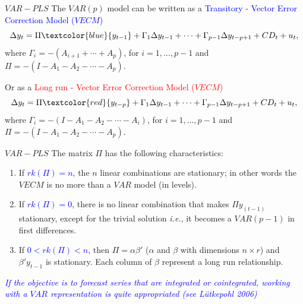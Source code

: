 \documentclass{beamer}
\newcommand{\?}{?`}
\begin{document}
\begin{frame}{$VAR-PLS$}
  The $VAR(p)$ model can be written as a  \textcolor{blue}{Transitory - Vector Error Correction Model ($VECM$)}
  \begin{displaymath}
    \Delta y_{t}=\Pi  \textcolor{blue}{ y_{t-1}}+\Gamma_1 \Delta y_{t-1} + \cdots +
    \Gamma_{p-1} \Delta y_{t-p+1} + CD_t + u_t,
  \end{displaymath}
  where $\Gamma_i=-(A_{i+1}+\cdots + A_p)$, for $i=1,\ldots ,p-1$ and
  $\Pi=-(I-A_1-A_2-\cdots - A_p)$.

\bigskip

  Or as a  \textcolor{red}{Long run - Vector Error Correction Model ($VECM$)}
  \begin{displaymath}
    \Delta y_t=\Pi \textcolor{red}{ y_{t-p}}+\Gamma_1 \Delta y_{t-1} + \cdots +
    \Gamma_{p-1} \Delta y_{t-p+1} + CD_t + u_t,
  \end{displaymath}
  where $\Gamma_i=-(I-A_{1}-A_2-\cdots -A_i)$, for $i=1,\ldots ,p-1$
  and $\Pi=-(I-A_1-A_2-\cdots - A_p)$.
\end{frame}


\begin{frame}{$VAR-PLS$}
  The matrix $\Pi$ has the following characteristics:
  \begin{enumerate}
  \item  If \textcolor{blue}{$rk(\Pi)=n$},  the $n$ linear combinations are stationary;
  in other words the $VECM$ is no more than a $VAR$ model (in levels).
  \item  If \textcolor{blue}{$rk(\Pi)=0$}, there is no linear combination that makes $\Pi y_{(t-1)}$ stationary,
  except for the trivial solution  {\it{i.e.}}, it becomes a $VAR(p-1)$ in first differences.
    \item  If \textcolor{blue}{$0<rk(\Pi)<n$}, then $\Pi=\alpha \beta'$ ($\alpha$ and $\beta$ with
    dimensions $n\times r$) and $\beta' y_{t-1}$ is stationary. Each
   column of $\beta$ represent a long run relationship.
  \end{enumerate}
\medskip
 \textcolor{blue}{ \it{If the objective is to forecast series that are integrated or cointegrated,
  working with a $VAR$ representation is quite appropriated (see L\"{u}tkepohl 2006) }}
\end{frame}
\end{document}
